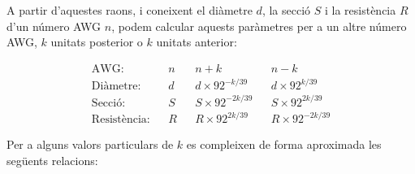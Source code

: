 A partir d'aquestes raons, i coneixent el diàmetre $d$, la secció $S$ i la resistència $R$ d'un número AWG $n$, podem calcular aquests paràmetres per a un altre número AWG, $k$ unitats posterior o $k$ unitats anterior:

\begin{equation}
   \begin{array}{rllllll}
     \text{AWG:}         & & n & & n+k                & & n-k \\
     \text{Diàmetre:}    & & d & & d\times 92^{-k/39}  & & d\times 92^{k/39} \\
     \text{Secció:}      & & S & & S\times 92^{-2k/39} & & S\times 92^{2k/39} \\
     \text{Resistència:} & & R & & R\times 92^{2k/39}  & & R\times 92^{-2k/39}
   \end{array}
\end{equation}

Per a alguns valors particulars de $k$ es compleixen de forma aproximada les següents relacions:

